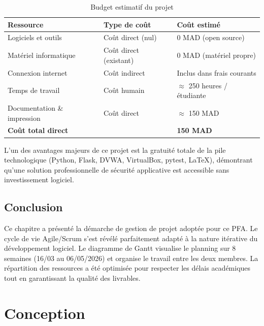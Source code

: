 \documentclass[12pt,a4paper]{report}
\newcommand{\hdr}[1]{\cellcolor{gray!15}\textbf{#1}}
\newcommand{\rowA}{\rowcolor{gray!8}}
\begin{document}
\begin{table}[H]
\centering
\caption{Budget estimatif du projet}
\begin{tabular}{p{5cm}p{3cm}p{3.5cm}}
\toprule
\hdr{Ressource} & \hdr{Type de coût} & \hdr{Coût estimé} \\
\midrule
Logiciels et outils & Coût direct (nul) & 0 MAD (open source) \\
\rowA Matériel informatique & Coût direct (existant) & 0 MAD (matériel propre) \\
Connexion internet & Coût indirect & Inclus dans frais courants \\
\rowA Temps de travail & Coût humain & $\approx$ 250 heures / étudiante \\
Documentation \& impression & Coût direct & $\approx$ 150 MAD \\
\midrule
\rowcolor{gray!12}\textbf{Coût total direct} & & \textbf{150 MAD} \\
\bottomrule
\end{tabular}
\end{table}

L'un des avantages majeurs de ce projet est la gratuité totale de la pile technologique
(Python, Flask, DVWA, VirtualBox, pytest, \LaTeX{}), démontrant qu'une solution professionnelle
de sécurité applicative est accessible sans investissement logiciel.

\section{Conclusion}

Ce chapitre a présenté la démarche de gestion de projet adoptée pour ce PFA. Le
cycle de vie Agile/Scrum s'est révélé parfaitement adapté à la nature itérative du
développement logiciel. Le diagramme de Gantt visualise le planning sur 8 semaines
(16/03 au 06/05/2026) et organise le travail entre les deux membres. La répartition des ressources
a été optimisée pour respecter les délais académiques tout en garantissant la qualité
des livrables.

\chapter{Conception}
\end{document}
